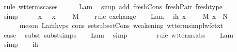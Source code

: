 \begin{isabellebody}
\ {\isacharparenleft}rule\ wt{\isacharunderscore}terms{\isacharunderscore}cases{\isacharunderscore}{}{\isacharparenright}\isanewline
\ \ \ \ \isamarkupfalse%
\ Lam{\isacharparenleft}{}{\isacharcomma}{}{\isacharparenright}\ \isamarkupfalse%
\ {\isacharparenleft}simp\ add{\isacharcolon}\ fresh{\isacharunderscore}Cons\ fresh{\isacharunderscore}Pair\ fresh{\isacharunderscore}type{\isacharparenright}\isanewline
\ \ \ \ \isamarkupfalse%
\ simp\isanewline
\ \ \isamarkupfalse%
\ \isamarkupfalse%
\ {\isachardoublequoteopen}{\isacharparenleft}x{\isacharcomma}\ {\isasymtau}{\isacharparenright}\ {\isacharhash}\ {\isacharparenleft}x{\isacharprime}{\isacharcomma}\ {\isasympi}{\isacharparenright}\ {\isacharhash}\ {\isasymGamma}\ {\isasymturnstile}\ M\ {\isacharcolon}\ {\isasymdelta}{\isachardoublequoteclose}\ \isamarkupfalse%
\ {\isacharparenleft}rule\ exchange{\isacharparenright}\isanewline
\isanewline
\ \ \isamarkupfalse%
\ Lam{\isacharparenleft}{}{\isacharcomma}{}{\isacharparenright}\ \isamarkupfalse%
\ ih{\isacharcolon}\ {\isachardoublequoteopen}{\isacharparenleft}x{\isacharprime}{\isacharcomma}\ {\isasympi}{\isacharparenright}\ {\isacharhash}\ {\isasymGamma}\ {\isasymturnstile}\ M\ {\isacharbrackleft}x\ {\isacharcolon}{\isacharcolon}{\isacharequal}\ N{\isacharbrackright}\ {\isacharcolon}\ {\isasymdelta}{\isachardoublequoteclose}\isanewline
\ \ \ \ \isamarkupfalse%
\ {\isacharparenleft}meson\ Lam{\isachardot}hyps{\isacharparenleft}{}{\isacharparenright}\ cons\ set{\isacharunderscore}subset{\isacharunderscore}Cons\ weakening\ wt{\isacharunderscore}terms{\isacharunderscore}impl{\isacharunderscore}wf{\isacharunderscore}ctxt{\isacharparenright}\isanewline
\isanewline
\ \ \isamarkupfalse%
\ {\isacharquery}case\ \isamarkupfalse%
\ {\isacharparenleft}subst\ subst{\isachardot}simps{\isacharparenright}\isanewline
\ \ \isamarkupfalse%
\ Lam\ \isamarkupfalse%
\ simp\isanewline
\ \ \isamarkupfalse%
\ {}{\isacharparenleft}{}{\isacharparenright}\isanewline
\ \ \isamarkupfalse%
\ {\isacharparenleft}rule\ wt{\isacharunderscore}terms{\isachardot}abs{\isacharparenright}\isanewline
\ \ \isamarkupfalse%
\ Lam\ \isamarkupfalse%
\ simp\isanewline
\ \ \isamarkupfalse%
\ ih\ \isamarkupfalse%

\end{isabellebody}
